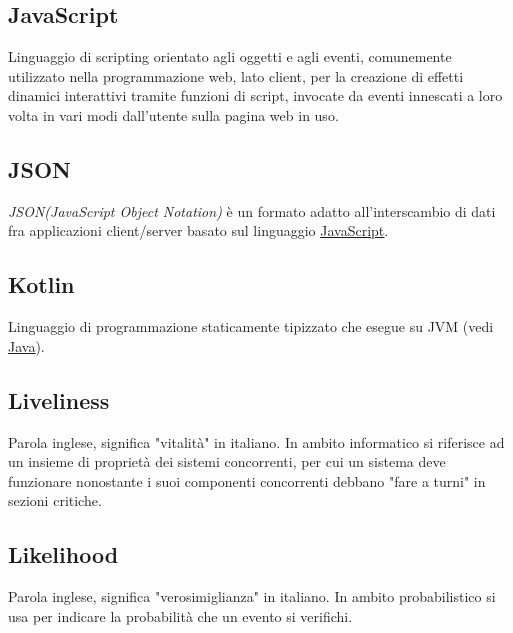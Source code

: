 	\subsection{JavaScript}
	\label{sec:javascript}
	Linguaggio di scripting orientato agli oggetti e agli eventi, comunemente utilizzato nella programmazione web, lato client, per la creazione di effetti dinamici interattivi tramite funzioni di script, invocate da eventi innescati a loro volta in vari modi dall'utente sulla pagina web in uso.

	\subsection{JSON}
	\label{sec:json}
	\emph{JSON(JavaScript Object Notation)} è un formato adatto all'interscambio di dati fra applicazioni client/server basato sul linguaggio \underline{\hyperref[sec:javascript]{JavaScript}}.
	\newpage

	\subsection{Kotlin}
	\label{sec:kotlin}
	Linguaggio di programmazione staticamente tipizzato che esegue su JVM (vedi \underline{\hyperref[sec:java]{Java}}).
	\newpage


	\subsection{Liveliness}
	\label{sec:liveliness}
	Parola inglese, significa "vitalità" in italiano. In ambito informatico si riferisce ad un insieme di proprietà dei sistemi concorrenti, per cui un sistema deve funzionare nonostante i suoi componenti concorrenti debbano "fare a turni" in sezioni critiche.

	\subsection{Likelihood}
	\label{sec:likelihood}
	Parola inglese, significa "verosimiglianza" in italiano. In ambito probabilistico si usa per indicare la probabilità che un evento si verifichi.

